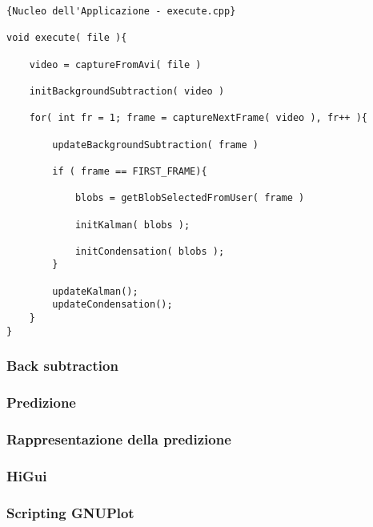 \lstset{language=c++}
\lstset{commentstyle=\emph}
\begin{lstlisting}[frame=l,caption=Nucleo dell'Applicazione - execute.cpp ,breaklines=true,basicstyle=\small]{Nucleo dell'Applicazione - execute.cpp}

void execute( file ){

	video = captureFromAvi( file )
	
	initBackgroundSubtraction( video )

	for( int fr = 1; frame = captureNextFrame( video ), fr++ ){
	
		updateBackgroundSubtraction( frame )
		
		if ( frame == FIRST_FRAME){
			
			blobs = getBlobSelectedFromUser( frame )
	
			initKalman( blobs );
			
			initCondensation( blobs );
		}
	
		updateKalman();
		updateCondensation();
	}
}

\end{lstlisting}

\subsubsection{Back subtraction}
\subsubsection{Predizione}
\subsubsection{Rappresentazione della predizione}
\subsubsection{HiGui}
\subsubsection{Scripting GNUPlot}

